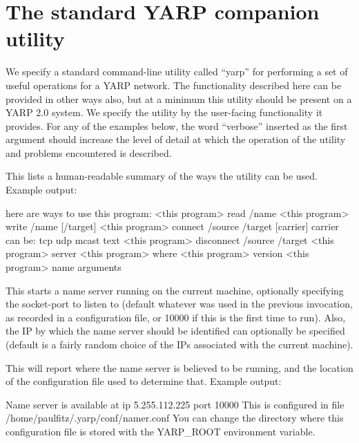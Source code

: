 \chapter{The standard YARP companion utility}

We specify a standard command-line 
utility called ``yarp'' for performing a set of
useful operations for a YARP network.  
%
The functionality described here 
can be provided in other ways also, but
at a minimum this utility should be present on a YARP 2.0 
system.
%
We specify the utility by the user-facing functionality
it provides.  For any of the examples below, the word ``verbose'' 
inserted as the first argument should increase the level of 
detail at which the operation of the utility and problems
encountered is described.


\newusage{}
%
This lists a human-readable summary of the 
ways the utility can be used.  Example output:

\begin{code}
here are ways to use this program:
  <this program> read /name
  <this program> write /name [/target]
  <this program> connect /source /target [carrier]
     carrier can be: tcp udp mcast text
  <this program> disconnect /source /target
  <this program> server
  <this program> where
  <this program> version
  <this program> name {arguments}
\end{code}


\newusage{}
%
This starts a name server running on the current machine, optionally
specifying the socket-port to listen to (default whatever was used in
the previous invocation, as recorded in a configuration file, or 10000
if this is the first time to run).
%
Also, the IP by which the name server should be identified can
optionally be specified (default is a fairly random choice of
the IPs associated with the current machine).

\newusage{}
%
This will report where the name server is believed to be running,
and the location of the configuration file used to determine that.
Example output:

\begin{code}
Name server is available at ip 5.255.112.225 port 10000
This is configured in file /home/paulfitz/.yarp/conf/namer.conf
You can change the directory where this configuration file is stored
with the YARP\_ROOT environment variable.
\end{code}

